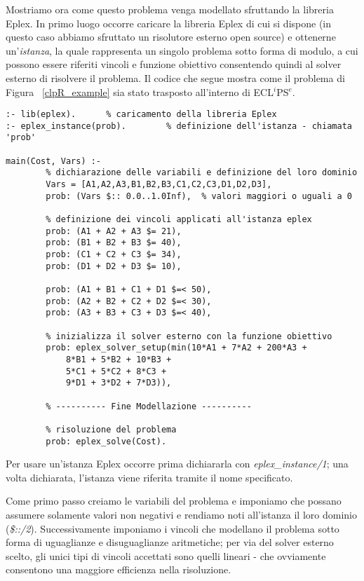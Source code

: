\documentclass[12pt,a4paper,openright,twoside]{report}
\begin{document}
Mostriamo ora come questo problema venga modellato sfruttando la libreria Eplex. In primo luogo occorre caricare la libreria Eplex di cui si dispone (in questo caso abbiamo sfruttato un risolutore esterno open source) e ottenerne un'\emph{istanza}, la quale rappresenta un singolo problema sotto forma di modulo, a cui possono essere riferiti vincoli e funzione obiettivo consentendo quindi al solver esterno di risolvere il problema. Il codice che segue mostra come il problema di Figura ~\ref{clpR_example} sia stato trasposto all'interno di ECL$^i$PS$^e$.

\begin{lstlisting}
:- lib(eplex).		% caricamento della libreria Eplex
:- eplex_instance(prob).		% definizione dell'istanza - chiamata 'prob'

main(Cost, Vars) :-
		% dichiarazione delle variabili e definizione del loro dominio		
		Vars = [A1,A2,A3,B1,B2,B3,C1,C2,C3,D1,D2,D3],
		prob: (Vars $:: 0.0..1.0Inf),  % valori maggiori o uguali a 0
		
		% definizione dei vincoli applicati all'istanza eplex
		prob: (A1 + A2 + A3 $= 21), 
		prob: (B1 + B2 + B3 $= 40),
		prob: (C1 + C2 + C3 $= 34),
		prob: (D1 + D2 + D3 $= 10),

		prob: (A1 + B1 + C1 + D1 $=< 50),
		prob: (A2 + B2 + C2 + D2 $=< 30),
		prob: (A3 + B3 + C3 + D3 $=< 40),

		% inizializza il solver esterno con la funzione obiettivo
		prob: eplex_solver_setup(min(10*A1 + 7*A2 + 200*A3 + 
			8*B1 + 5*B2 + 10*B3 +
		 	5*C1 + 5*C2 + 8*C3 +
		 	9*D1 + 3*D2 + 7*D3)),

		% ---------- Fine Modellazione ----------

		% risoluzione del problema
		prob: eplex_solve(Cost).
\end{lstlisting}

Per usare un'istanza Eplex occorre prima dichiararla con \emph{eplex\_instance/1}; una volta dichiarata, l'istanza viene riferita tramite il nome specificato. 

Come primo passo creiamo le variabili del problema e imponiamo che possano assumere solamente valori non negativi e rendiamo noti all'istanza il loro dominio (\emph{\$::/2}). Successivamente imponiamo i vincoli che modellano il problema sotto forma di uguaglianze e disuguaglianze aritmetiche; per via del solver esterno scelto, gli unici tipi di vincoli accettati sono quelli lineari - che ovviamente consentono una maggiore efficienza nella risoluzione.
\end{document}
